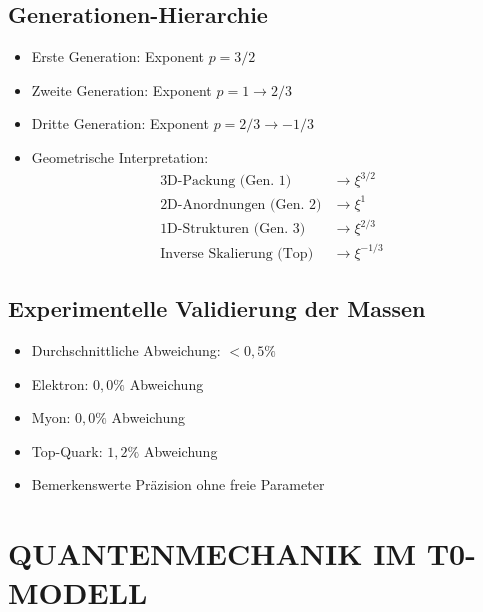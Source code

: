 \documentclass[12pt,a4paper]{article}
\begin{document}
\subsection{Generationen-Hierarchie}
\begin{itemize}
	\item Erste Generation: Exponent $p = 3/2$
	\item Zweite Generation: Exponent $p = 1 \rightarrow 2/3$
	\item Dritte Generation: Exponent $p = 2/3 \rightarrow -1/3$
	
	\item Geometrische Interpretation:
	\begin{align*}
		\text{3D-Packung (Gen. 1)} &\rightarrow \xi^{3/2}\\
		\text{2D-Anordnungen (Gen. 2)} &\rightarrow \xi^1\\
		\text{1D-Strukturen (Gen. 3)} &\rightarrow \xi^{2/3}\\
		\text{Inverse Skalierung (Top)} &\rightarrow \xi^{-1/3}
	\end{align*}
\end{itemize}

\subsection{Experimentelle Validierung der Massen}
\begin{itemize}
	\item Durchschnittliche Abweichung: $< 0{,}5\%$
	\item Elektron: $0{,}0\%$ Abweichung
	\item Myon: $0{,}0\%$ Abweichung  
	\item Top-Quark: $1{,}2\%$ Abweichung
	\item Bemerkenswerte Präzision ohne freie Parameter
\end{itemize}
	\section{QUANTENMECHANIK IM T0-MODELL}
	
\end{document}
